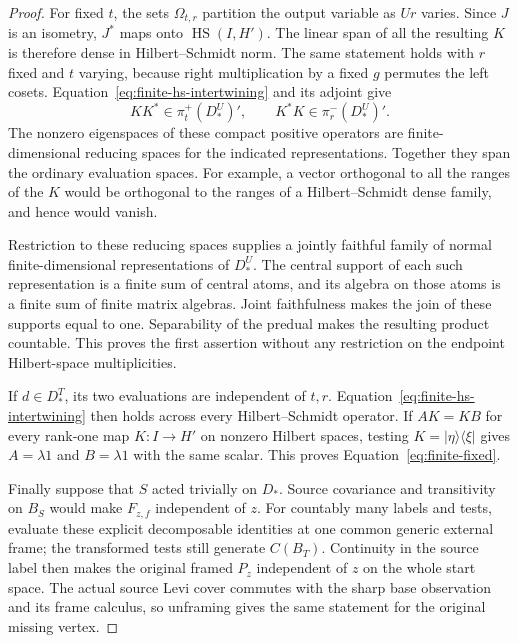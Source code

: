 \begin{proof}
For fixed $t$, the sets $\Omega_{t,r}$ partition the output variable as
$Ur$ varies.  Since $J$ is an isometry, $J^*$ maps onto
$\operatorname{HS}(I,H')$.  The linear span of all the resulting $K$
is therefore dense in Hilbert--Schmidt norm.  The same statement holds
with $r$ fixed and $t$ varying, because right multiplication by a fixed
$g$ permutes the left cosets.
Equation~\eqref{eq:finite-hs-intertwining} and its adjoint give
\[
 KK^*\in\pi_t^+(D_*^U)',\qquad
 K^*K\in\pi_r^-(D_*^U)'.
\]
The nonzero eigenspaces of these compact positive operators are
finite-dimensional reducing spaces for the indicated representations.
Together they span the ordinary evaluation spaces.  For example, a
vector orthogonal to all the ranges of the $K$ would be orthogonal to
the ranges of a Hilbert--Schmidt dense family, and hence would vanish.

Restriction to these reducing spaces supplies a jointly faithful
family of normal finite-dimensional representations of $D_*^U$.
The central support of each such representation is a finite sum of
central atoms, and its algebra on those atoms is a finite sum of finite
matrix algebras.  Joint faithfulness makes the join of these supports
equal to one.  Separability of the predual makes the resulting product
countable.  This proves the first assertion without any restriction
on the endpoint Hilbert-space multiplicities.

If $d\in D_*^T$, its two evaluations are independent of $t,r$.
Equation~\eqref{eq:finite-hs-intertwining} then holds across every
Hilbert--Schmidt operator.  If $AK=KB$ for every rank-one map
$K:I\to H'$ on nonzero Hilbert spaces, testing
$K=|\eta\rangle\langle\xi|$ gives $A=\lambda1$ and $B=\lambda1$
with the same scalar.  This proves Equation~\eqref{eq:finite-fixed}.

Finally suppose that $S$ acted trivially on $D_*$.  Source covariance
and transitivity on $B_S$ would make $F_{z,f}$ independent of $z$.
For countably many labels and tests, evaluate these explicit
decomposable identities at one common generic external frame; the
transformed tests still generate $C(B_T)$.  Continuity in the source
label then makes the original framed $P_z$ independent of $z$ on the
whole start space.  The actual source Levi cover commutes with the
sharp base observation and its frame calculus, so unframing gives the
same statement for the original missing vertex.


\end{proof}

